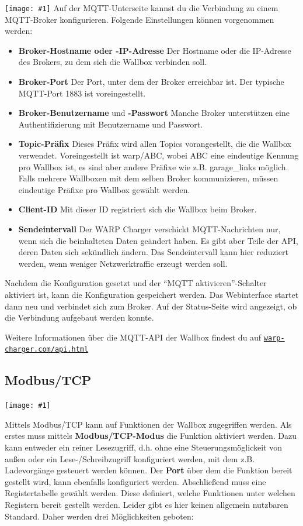 \documentclass[a4paper,10pt]{article}
\newcommand{\gfx}[1]{\texttt{[image: \#1]}}
\newcommand\rurl[2]{%
  \href{#1}{\nolinkurl{#2}}%
}
\begin{document}
\begin{multicols*}{2}
	\gfx{./img_warp2/resized/web_mqtt}
	Auf der MQTT-Unterseite kannst du die Verbindung zu einem MQTT-Broker konfigurieren. Folgende Einstellungen können vorgenommen werden:
	\begin{itemize}
		\item \textbf{Broker-Hostname oder -IP-Adresse} Der Host\-name oder die IP-Adresse des Brokers, zu dem sich die Wallbox verbinden soll.
		\item \textbf{Broker-Port} Der Port, unter dem der Broker erreichbar ist. Der typische MQTT-Port 1883 ist voreingestellt.
		\item \textbf{Broker-Benutzername} und \textbf{-Passwort} Manche Broker unterstützen eine Authentifizierung mit Benutzername und Passwort.
		\item \textbf{Topic-Präfix} Dieses Präfix wird allen Topics vorangestellt, die die Wallbox verwendet.
		      Voreingestellt ist warp/ABC, wobei ABC eine eindeutige Kennung pro Wallbox ist,
		      es sind aber andere Präfixe wie z.B. garage\_links möglich.
		      Falls mehrere Wallboxen mit dem selben Broker kommunizieren,
		      müssen eindeutige Präfixe pro Wallbox gewählt werden.
		\item \textbf{Client-ID} Mit dieser ID registriert sich die Wallbox beim Broker.
		\item \textbf{Sendeintervall} Der WARP Charger verschickt MQTT-Nachrichten nur, wenn sich die beinhalteten Daten geändert haben.
			Es gibt aber Teile der API, deren Daten sich sekündlich ändern. Das Sendeintervall kann hier reduziert werden, wenn weniger Netzwerktraffic
			erzeugt werden soll.
	\end{itemize}
	Nachdem die Konfiguration gesetzt und der \enquote{MQTT aktivieren}-Schalter aktiviert ist, kann die Konfiguration gespeichert werden.
	Das Webinterface startet dann neu und verbindet sich zum Broker.
	Auf der Status-Seite wird angezeigt, ob die Verbindung aufgebaut werden konnte.

	Weitere Informationen über die MQTT-API der Wallbox findest du auf \rurl{https://warp-charger.com/api.html}{warp-charger.com/api.html}

	\subsection{Modbus/TCP}

	\gfx{./img_warp2/resized/web_modbus_tcp}

	Mittels Modbus/TCP kann auf Funktionen der Wallbox zugegriffen werden.
	Als erstes muss mittels \textbf{Modbus/TCP-Modus} die Funktion aktiviert
	werden. Dazu kann entweder ein reiner Lesezugriff, d.h. ohne eine
	Steuerungsmöglickeit von außen oder ein Lese-/Schreibzugriff
	konfiguriert werden, mit dem z.B. Ladevorgänge gesteuert werden können.
	Der \textbf{Port} über dem die Funktion bereit gestellt
	wird, kann ebenfalls konfiguriert werden. Abschließend muss eine
	Registertabelle gewählt werden. Diese definiert, welche Funktionen unter
	welchen Registern bereit gestellt werden. Leider gibt es hier keinen
	allgemein nutzbaren Standard. Daher werden drei Möglichkeiten geboten:


\end{multicols*}
\end{document}
